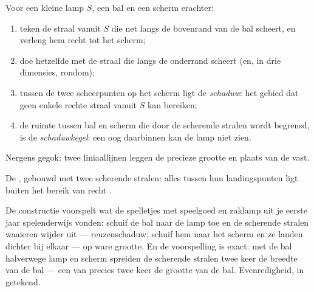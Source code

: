 \begin{method}\label{met:g6:light-propagation:shadow}
Voor een kleine lamp $S$, een bal en een scherm erachter:
\begin{enumerate}
  \item teken de straal vanuit $S$ die net langs de bovenrand van de
        bal scheert, en verleng hem recht tot het scherm;
  \item doe hetzelfde met de straal die langs de onderrand scheert
        (en, in drie dimensies, rondom);
  \item tussen de twee scheerpunten op het scherm ligt de
        \emph{schaduw}: het gebied dat geen enkele
        rechte straal vanuit $S$ kan bereiken;
  \item de ruimte tussen bal en scherm die door de scherende stralen
        wordt begrensd, is de \emph{schaduwkegel}: een oog daarbinnen
        kan de lamp niet zien.
\end{enumerate}
Nergens gegok: twee liniaallijnen leggen de precieze grootte en plaats
van de  vast.
\end{method}

\begin{omfigure}

{\small De , gebouwd met twee scherende stralen: alles tussen hun
landingspunten ligt buiten het bereik van recht .}
\end{omfigure}

\begin{example}\label{ex:g6:light-propagation:sizes}
De constructie voorspelt wat de spelletjes met speelgoed en zaklamp uit
je eerste jaar spelenderwijs vonden: schuif de bal naar de lamp toe en de
scherende stralen waaieren wijder uit --- reuzenschaduw; schuif hem
naar het scherm en ze landen dichter bij elkaar ---  op ware
grootte. En de voorspelling is exact: met de bal halverwege lamp en
scherm spreiden de scherende stralen twee keer de breedte van de bal
--- een  van precies twee keer de grootte van de bal.
Evenredigheid, in  getekend.
\end{example}

